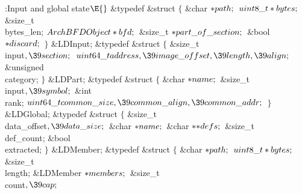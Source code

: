 \Y\B\4:Input and global state\X${}\E{}$\6
\&{typedef} \&{struct} ${}\{{}$\1\6
\&{char} ${}{*}\\{path};{}$\7
${}\\{uint8\_t}*\\{bytes};{}$\7
\&{size\_t} \\{bytes\_len};\7
${}\\{ArchBFDObject}*\\{bfd};{}$\7
\&{size\_t} ${}{*}\\{part\_of\_section};{}$\6
\&{bool} ${}{*}\\{discard};{}$\2\6
${}\}{}$ \&{LDInput};\6
\&{typedef} \&{struct} ${}\{{}$\1\6
\&{size\_t} \\{input}${},\39\\{section};{}$\7
${}\\{uint64\_t}\\{address},\39\\{image\_offset},\39\\{length},\39\\{align};{}$%
\7
\&{unsigned} \\{category};\2\6
${}\}{}$ \&{LDPart};\6
\&{typedef} \&{struct} ${}\{{}$\1\6
\&{char} ${}{*}\\{name};{}$\6
\&{size\_t} \\{input}${},\39\\{symbol};{}$\6
\&{int} \\{rank};\7
${}\\{uint64\_t}\\{common\_size},\39\\{common\_align},\39\\{common\_addr};{}$\2%
\6
${}\}{}$ \&{LDGlobal};\6
\&{typedef} \&{struct} ${}\{{}$\1\6
\&{size\_t} \\{data\_offset}${},\39\\{data\_size};{}$\6
\&{char} ${}{*}\\{name};{}$\6
\&{char} ${}{*}{*}\\{defs};{}$\6
\&{size\_t} \\{def\_count};\6
\&{bool} \\{extracted};\2\6
${}\}{}$ \&{LDMember};\6
\&{typedef} \&{struct} ${}\{{}$\1\6
\&{char} ${}{*}\\{path};{}$\7
${}\\{uint8\_t}*\\{bytes};{}$\7
\&{size\_t} \\{length};\6
\&{LDMember} ${}{*}\\{members};{}$\6
\&{size\_t} \\{count}${},\39\\{cap};{}$\2\6
